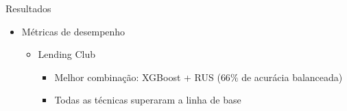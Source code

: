 \begin{frame}{Resultados}

  \begin{itemize}
    \item[$\blacktriangleright$] Métricas de desempenho
      \begin{itemize}
        \item Lending Club
          \begin{itemize}
            \item[$\checkmark$] Melhor combinação: XGBoost + RUS ($66\%$ de acurácia balanceada)
            \item[$\checkmark$] Todas as técnicas superaram a linha de base
          \end{itemize}
      \end{itemize}
  \end{itemize}

  \scriptsize
  \setlength{\tabcolsep}{2pt}
  \renewcommand{\arraystretch}{1.05}


\end{frame}
